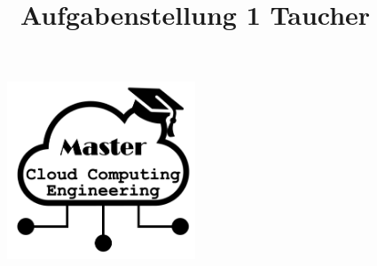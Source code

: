 \title{Aufgabenstellung 1 Taucher}

\begin{figure}
    \centering
    \includegraphics[width=0.5\textwidth]{fig/Fig1.png}
    \label{fig:title-image}
\end{figure}

